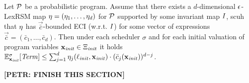 \begin{corollary}
\label{col:runtime-progs}
Let $\mathcal{P}$ be a probabilistic program. Assume that there exists a 
$d$-dimensional $\epsilon$-LexRSM map $\mathbf{\eta}=(\eta_1,\dots,\eta_d)$ for 
$\mathcal{P}$ supported 
by some 
invariant map $I$, scuh that $\mathbf{\eta}$ has $\vec{\bar{c}}$-bounded ECI 
(w.r.t. $I$) 
for some vector of expressions $\vec{\bar{c}}=(\bar{c}_1,\dots,\bar{c}_d)$. 
Then under each scheduler $\sigma$ and for each initial valuation of program 
variables $\mathbf{x}_{\mathit{init}}\in\Xi_{\mathit{init}}$ it holds $\mathbb{E}^{\sigma}_{\mathbf{x}_{\mathit{init}}}[\mathit{Term}]\leq 
\sum_{j=1}^{d}\eta_j(\ell_{\mathit{init}},\mathbf{x}_{\mathit{init}})\cdot(\bar{c}_j(\mathbf{x}_{\mathit{init}}))^{d-j}$.
\end{corollary}

\textbf{[PETR: FINISH THIS SECTION]}

